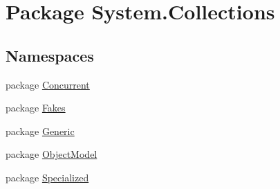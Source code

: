 \hypertarget{namespace_system_1_1_collections}{\section{Package System.\-Collections}
\label{namespace_system_1_1_collections}
}
\subsection*{Namespaces}
\begin{DoxyCompactItemize}
\item 
package \hyperlink{namespace_system_1_1_collections_1_1_concurrent}{Concurrent}
\item 
package \hyperlink{namespace_system_1_1_collections_1_1_fakes}{Fakes}
\item 
package \hyperlink{namespace_system_1_1_collections_1_1_generic}{Generic}
\item 
package \hyperlink{namespace_system_1_1_collections_1_1_object_model}{Object\-Model}
\item 
package \hyperlink{namespace_system_1_1_collections_1_1_specialized}{Specialized}
\end{DoxyCompactItemize}
